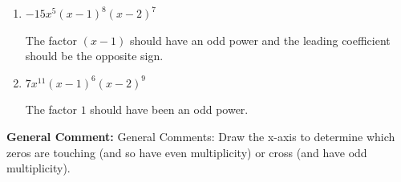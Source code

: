 \documentclass{extbook}[14pt]
\begin{document}
\begin{enumerate}
{\begin{enumerate}[label=\Alph*.]
The factors $1$ and $2$ have have been odd power.
\item \( -15x^{5} (x - 1)^{8} (x - 2)^{7} \)

The factor $(x - 1)$ should have an odd power and the leading coefficient should be the opposite sign.
\item \( 7x^{11} (x - 1)^{6} (x - 2)^{9} \)

The factor $1$ should have been an odd power.
\end{enumerate}

\textbf{General Comment:} General Comments: Draw the x-axis to determine which zeros are touching (and so have even multiplicity) or cross (and have odd multiplicity).
}
\end{enumerate}
\end{document}
